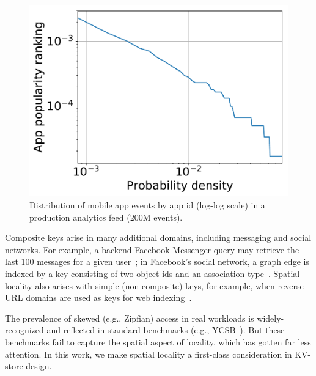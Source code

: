

\begin{figure}[tb]
\centering
\includegraphics[width=0.6\columnwidth]{figs/app_names_loglog_line.pdf}
\caption{{Distribution of mobile app events by app id (log-log scale) in a production analytics feed (200M events).}}
\label{fig:cdf}
\end{figure}

Composite keys arise in many additional domains, including messaging and social networks. 
For example, a backend Facebook Messenger query may retrieve the last 100 messages for a 
given user~\cite{Borthakur:2011:AHG:1989323.1989438}; %
in Facebook's social network, a graph edge is indexed by a key consisting of two 
object ids and an association type~\cite{Armstrong:2013:LDB:2463676.2465296}.
Spatial locality   also arises with simple (non-composite) keys, for example, when 
reverse  URL domains are used as keys for web  indexing~\cite{Cho:1998:ECT:297805.297835}. 

The prevalence of skewed (e.g., Zipfian)  access  in real workloads is widely-recognized 
and reflected in standard benchmarks (e.g., YCSB~\cite{YCSB}). %
But these benchmarks fail to capture the spatial aspect of locality, which has gotten far less attention.
In this work, we make spatial locality a first-class consideration in KV-store design.



